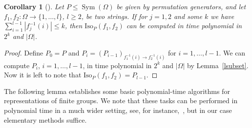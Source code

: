 \documentclass{article}
\newtheorem{corollary}[theorem]{Corollary}
\DeclareMathOperator{\Sym}{Sym}
\begin{document}
\begin{corollary}[{\cite[Corollary~5.1]{absyl}}]\label{cstrings}
	Let \( P \leq \Sym(\Omega) \) be given by permutation generators, and let \( f_1, f_2 : \Omega \to \{ 1, \dots, l \} \), \( l \geq 2 \), be two strings.
	If for \( j = 1, 2 \) and some \( k \) we have \( \sum_{i=1}^{l-1} |f_j^{-1}(i)| \leq k \), then \( \mathrm{Iso}_P(f_1, f_2) \)
	can be computed in time polynomial in \( 2^k \) and \( |\Omega| \).
\end{corollary}
\begin{proof}
	Define \( P_0 = P \) and \( P_i = (P_{i-1})_{f_1^{-1}(i) \to f_2^{-1}(i)} \) for \( i = 1, \dots, l-1 \).
	We can compute \( P_i \), \( i = 1, \dots, l-1 \), in time polynomial in \( 2^k \) and \( |\Omega| \) by Lemma~\ref{lsubset}.
	Now it is left to note that \( \mathrm{Iso}_P(f_1, f_2) = P_{l-1} \).
\end{proof}

The following lemma establishes some basic polynomial-time algorithms for representations of finite groups.
We note that these tasks can be performed in polynomial time in a much wider setting, see, for instance,~\cite[Chapter~7]{holt},
but in our case elementary methods suffice.
\end{document}
